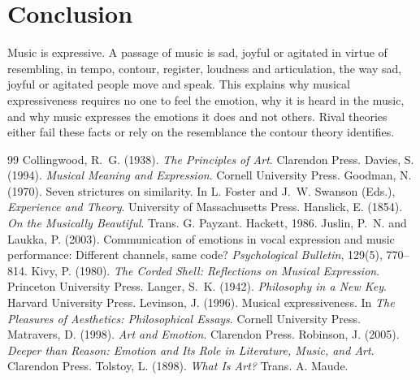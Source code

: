 \documentclass{situationist-preprint}
\begin{document}
\section{Conclusion}

Music is expressive. A passage of music is sad, joyful or agitated in virtue of resembling, in tempo, contour, register, loudness and articulation, the way sad, joyful or agitated people move and speak. This explains why musical expressiveness requires no one to feel the emotion, why it is heard in the music, and why music expresses the emotions it does and not others. Rival theories either fail these facts or rely on the resemblance the contour theory identifies.

\begin{thebibliography}{99}\small
{} Collingwood, R.~G. (1938). \emph{The Principles of Art}. Clarendon Press.
 Davies, S. (1994). \emph{Musical Meaning and Expression}. Cornell University Press.
 Goodman, N. (1970). Seven strictures on similarity. In L. Foster and J.~W. Swanson (Eds.), \emph{Experience and Theory}. University of Massachusetts Press.
 Hanslick, E. (1854). \emph{On the Musically Beautiful}. Trans. G. Payzant. Hackett, 1986.
 Juslin, P.~N. and Laukka, P. (2003). Communication of emotions in vocal expression and music performance: Different channels, same code? \emph{Psychological Bulletin}, 129(5), 770--814.
 Kivy, P. (1980). \emph{The Corded Shell: Reflections on Musical Expression}. Princeton University Press.
 Langer, S.~K. (1942). \emph{Philosophy in a New Key}. Harvard University Press.
 Levinson, J. (1996). Musical expressiveness. In \emph{The Pleasures of Aesthetics: Philosophical Essays}. Cornell University Press.
 Matravers, D. (1998). \emph{Art and Emotion}. Clarendon Press.
 Robinson, J. (2005). \emph{Deeper than Reason: Emotion and Its Role in Literature, Music, and Art}. Clarendon Press.
 Tolstoy, L. (1898). \emph{What Is Art?} Trans. A. Maude.
\end{thebibliography}
\end{document}

